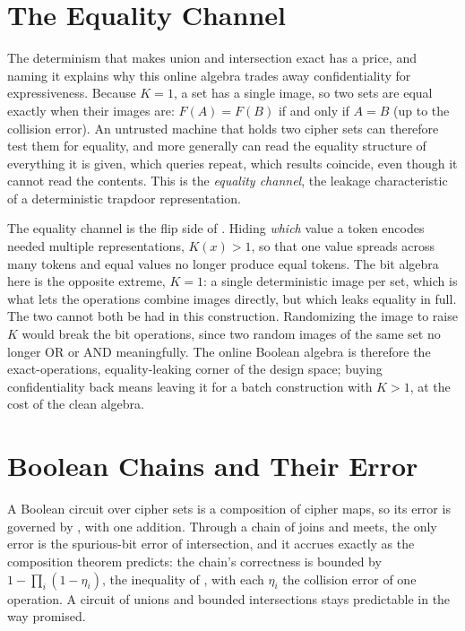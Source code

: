 \section{The Equality Channel}
\label{sec:equality-channel}

The determinism that makes union and intersection exact has a price, and
naming it explains why this online algebra trades away confidentiality for
expressiveness. Because $K = 1$, a set has a single image, so two sets are
equal exactly when their images are: $F(A) = F(B)$ if and only if $A = B$
(up to the collision error). An untrusted machine that holds two cipher
sets can therefore test them for equality, and more generally can read the
equality structure of everything it is given, which queries repeat, which
results coincide, even though it cannot read the contents. This is the
\emph{equality channel}, the leakage characteristic of a deterministic
trapdoor representation.

\begin{remark}
\label{rem:equality-channel}
The equality channel is the flip side of . Hiding
\emph{which} value a token encodes needed multiple representations,
$K(x) > 1$, so that one value spreads across many tokens and equal values no
longer produce equal tokens. The bit algebra here is the opposite extreme,
$K = 1$: a single deterministic image per set, which is what lets the
operations combine images directly, but which leaks equality in full. The
two cannot both be had in this construction. Randomizing the image to raise
$K$ would break the bit operations, since two random images of the same set
no longer OR or AND meaningfully. The online Boolean algebra is therefore
the exact-operations, equality-leaking corner of the design space; buying
confidentiality back means leaving it for a batch construction with
$K > 1$, at the cost of the clean algebra.
\end{remark}

\section{Boolean Chains and Their Error}
\label{sec:boolean-chains}

A Boolean circuit over cipher sets is a composition of cipher maps, so its
error is governed by , with one addition. Through a
chain of joins and meets, the only error is the spurious-bit error of
intersection, and it accrues exactly as the composition theorem predicts:
the chain's correctness is bounded by $1 - \prod_i (1 - \eta_i)$, the
inequality of , with each $\eta_i$ the collision
error of one operation. A circuit of unions and bounded intersections stays
predictable in the way  promised.

